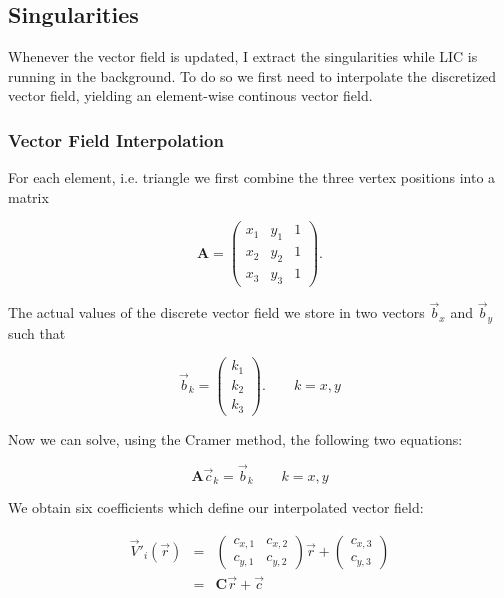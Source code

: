 \documentclass[a4paper,10pt,notitlepage]{scrartcl}
\newcommand{\mat}[1]{\mathbf{#1}}
\begin{document}
\subsection{Singularities}

Whenever the vector field is updated, I extract the singularities while LIC is
running in the background. To do so we first need to interpolate the discretized
vector field, yielding an element-wise continous vector field.

\subsubsection{Vector Field Interpolation}

For each element, i.e. triangle we first combine the three vertex positions
into a matrix

\begin{equation}
 \mat{A} = \left(
\begin{array}{ccc}
x_1 & y_1 & 1 \\
x_2 & y_2 & 1 \\
x_3 & y_3 & 1 \end{array} \right).
\end{equation}

The actual values of the discrete vector field we store in two vectors
$\vec{b}_x$ and $\vec{b}_y$ such that

\begin{equation}
 \vec{b}_{k} = \left( \begin{array}{c} k_1 \\ k_2 \\ k_3 \end{array} \right) .
\qquad k = x,y
\end{equation}

Now we can solve, using the Cramer method, the following two equations:

\begin{equation}
 \mat{A} \vec{c}_k = \vec{b}_k \qquad k = x,y
\end{equation}

We obtain six coefficients which define our interpolated vector field:

\begin{eqnarray}
 \vec{V}'_i(\vec{r}) &=& \left(
\begin{array}{cc}
c_{x,1} & c_{x,2} \\
c_{y,1} & c_{y,2} \end{array} \right) \vec{r} + \left( \begin{array}{c} c_{x,3}
\\ c_{y,3} \end{array} \right) \\
 &=& \mat{C} \vec{r} + \vec{c}
\label{eq:interpolated-field}
\end{eqnarray}
\end{document}
